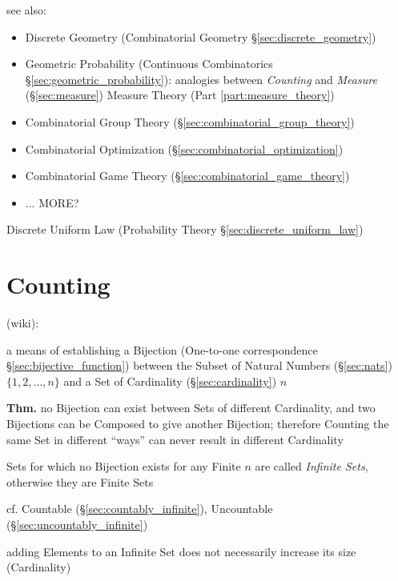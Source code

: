 see also:
\begin{itemize}
  \item Discrete Geometry (Combinatorial Geometry \S\ref{sec:discrete_geometry})
  \item Geometric Probability (Continuous Combinatorics
    \S\ref{sec:geometric_probability}): analogies between \emph{Counting} and
    \emph{Measure} (\S\ref{sec:measure}) \fist Measure Theory (Part
    \ref{part:measure_theory})
  \item Combinatorial Group Theory (\S\ref{sec:combinatorial_group_theory})
  \item Combinatorial Optimization (\S\ref{sec:combinatorial_optimization})
  \item Combinatorial Game Theory (\S\ref{sec:combinatorial_game_theory})
  \item ... MORE?
\end{itemize}

\fist Discrete Uniform Law (Probability Theory \S\ref{sec:discrete_uniform_law})



\section{Counting}\label{sec:counting}

(wiki):

a means of establishing a Bijection (One-to-one correspondence
\S\ref{sec:bijective_function}) between the Subset of Natural Numbers
(\S\ref{sec:nats}) $\{1, 2, \ldots, n\}$ and a Set of Cardinality
(\S\ref{sec:cardinality}) $n$

\textbf{Thm.} no Bijection can exist between Sets of different Cardinality, and
two Bijections can be Composed to give another Bijection; therefore Counting the
same Set in different ``ways'' can never result in different Cardinality

Sets for which no Bijection exists for any Finite $n$ are called \emph{Infinite
  Sets}, otherwise they are Finite Sets

cf. Countable (\S\ref{sec:countably_infinite}), Uncountable
(\S\ref{sec:uncountably_infinite})

adding Elements to an Infinite Set does not necessarily increase its size
(Cardinality)



